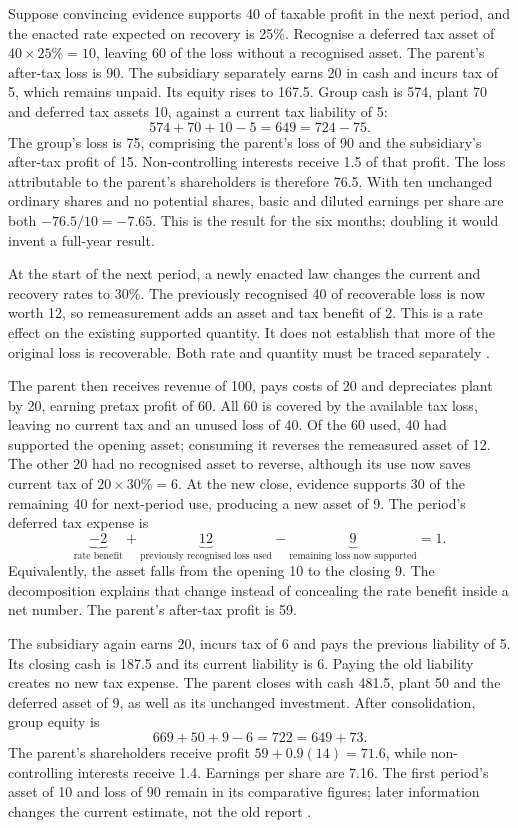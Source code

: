 Suppose convincing evidence supports 40 of taxable profit in the next period,
and the enacted rate expected on recovery is 25\%. Recognise a deferred tax
asset of \(40\times25\%=10\), leaving 60 of the loss without a recognised
asset. The parent's after-tax loss is 90. The subsidiary separately earns
20 in cash and incurs tax of 5, which remains unpaid. Its equity rises to
167.5. Group cash is 574, plant 70 and deferred tax assets 10, against a
current tax liability of 5:
\[
  574+70+10-5=649=724-75.
\]
The group's loss is 75, comprising the parent's loss of 90 and the
subsidiary's after-tax profit of 15. Non-controlling interests receive 1.5 of
that profit. The loss attributable to the parent's shareholders is therefore
76.5. With ten unchanged ordinary shares and no potential shares, basic and
diluted earnings per share are both \(-76.5/10=-7.65\). This is the result
for the six months; doubling it would invent a full-year result.

At the start of the next period, a newly enacted law changes the current and
recovery rates to 30\%. The previously recognised 40 of recoverable loss is
now worth 12, so remeasurement adds an asset and tax benefit of 2. This is a
rate effect on the existing supported quantity. It does not establish that
more of the original loss is recoverable. Both rate and quantity must be
traced separately \citep[IAS~12.47,56,60,79--82]{eu20231803}.

The parent then receives revenue of 100, pays costs of 20 and depreciates
plant by 20, earning pretax profit of 60. All 60 is covered by the available
tax loss, leaving no current tax and an unused loss of 40. Of the 60 used,
40 had supported the opening asset; consuming it reverses the remeasured
asset of 12. The other 20 had no recognised asset to reverse, although its
use now saves current tax of \(20\times30\%=6\). At the new close, evidence
supports 30 of the remaining 40 for next-period use, producing a new asset
of 9. The period's deferred tax expense is
\[
  \underbrace{-2}_{\text{rate benefit}}
  +\underbrace{12}_{\text{previously recognised loss used}}
  -\underbrace{9}_{\text{remaining loss now supported}}=1.
\]
Equivalently, the asset falls from the opening 10 to the closing 9. The
decomposition explains that change instead of concealing the rate benefit
inside a net number. The parent's after-tax profit is 59.

The subsidiary again earns 20, incurs tax of 6 and pays the previous
liability of 5. Its closing cash is 187.5 and its current liability is 6.
Paying the old liability creates no new tax expense. The parent closes with
cash 481.5, plant 50 and the deferred asset of 9, as well as its unchanged
investment. After consolidation, group equity is
\[
  669+50+9-6=722=649+73.
\]
The parent's shareholders receive profit \(59+0.9(14)=71.6\), while
non-controlling interests receive 1.4. Earnings per share are 7.16. The first
period's asset of 10 and loss of 90 remain in its comparative figures; later
information changes the current estimate, not the old report
\citep[IAS~8.34--38]{eu20231803}.

